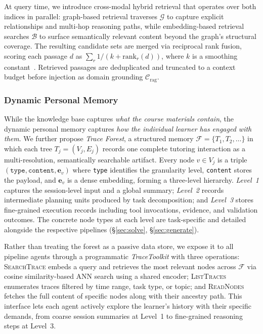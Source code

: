 At query time, we introduce cross-modal hybrid retrieval that operates over both indices in parallel: graph-based retrieval traverses $\mathcal{G}$ to capture explicit relationships and multi-hop reasoning paths, while embedding-based retrieval searches $\mathcal{B}$ to surface semantically relevant content beyond the graph's structural coverage.
The resulting candidate sets are merged via reciprocal rank fusion, scoring each passage $d$ as $\textstyle\sum_{r}{1}/({k+\mathrm{rank}_r(d)})$, where $k$ is a smoothing constant~\citep{cormack2009reciprocal}.
Retrieved passages are deduplicated and truncated to a context budget before injection as domain grounding $\mathcal{C}_{\text{rag}}$.

\subsubsection{Dynamic Personal Memory}
\label{sec:memory}

While the knowledge base captures \emph{what the course materials contain}, the dynamic personal memory captures \emph{how the individual learner has engaged with them}.
We further propose \textit{Trace Forest}, a structured memory $\mathcal{F} = \{T_1, T_2, \ldots\}$ in which each tree $T_j = (V_j, E_j)$ records one complete tutoring interaction as a multi-resolution, semantically searchable artifact.
Every node $v \in V_j$ is a triple $(\texttt{type}, \texttt{content}, \mathbf{e}_v)$ where \texttt{type} identifies the granularity level, \texttt{content} stores the payload, and $\mathbf{e}_v$ is a dense embedding, forming a three-level hierarchy. \textit{Level~1} captures the session-level input and a global summary; \textit{Level~2} records intermediate planning units produced by task decomposition; and \textit{Level~3} stores fine-grained execution records including tool invocations, evidence, and validation outcomes.
The concrete node types at each level are task-specific and detailed alongside the respective pipelines (\S\ref{sec:solve}, \S\ref{sec:generate}).

Rather than treating the forest as a passive data store, we expose it to all pipeline agents through a programmatic \emph{TraceToolkit} with three operations: \textsc{SearchTrace} embeds a query and retrieves the most relevant nodes across $\mathcal{F}$ via cosine similarity-based ANN search using a shared encoder; \textsc{ListTraces} enumerates traces filtered by time range, task type, or topic; and \textsc{ReadNodes} fetches the full content of specific nodes along with their ancestry path.
This interface lets each agent actively explore the learner's history with their specific demands, from coarse session summaries at Level~1 to fine-grained reasoning steps at Level~3.

